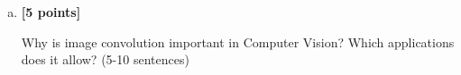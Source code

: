 \begin{enumerate}[(a)]

    
\item \textbf{[5 points]} 
\begin{tcolorbox}[colback=orange!5!white,colframe=orange!75!black]
Why is image convolution important in Computer Vision? Which applications does it allow? (5-10 sentences)
\end{tcolorbox}
\end{enumerate}




